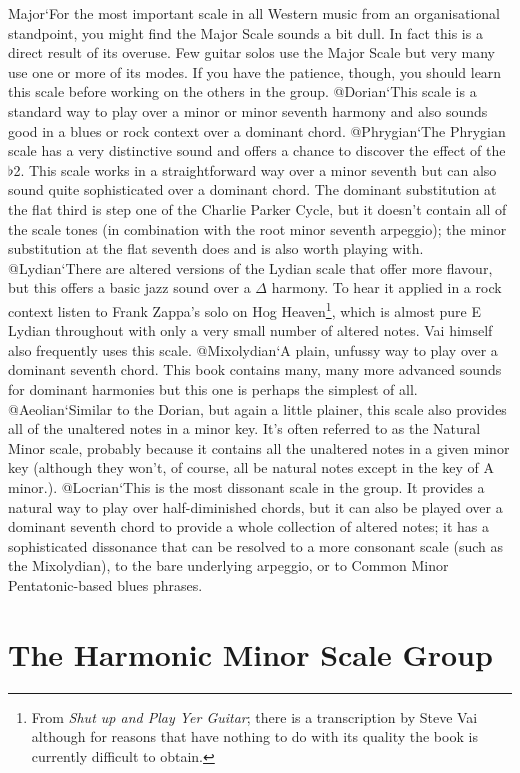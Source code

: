 \documentclass[english]{./gbook}
\begin{document}
\begin{large}
Major`For the most important scale in all Western music from an organisational standpoint, you might find the Major Scale sounds a bit dull. In fact this is a direct result of its overuse. Few guitar solos use the Major Scale but very many use one or more of its modes. If you have the patience, though, you should learn this scale before working on the others in the group.
@Dorian`This scale is a standard way to play over a minor or minor seventh harmony and also sounds good in a blues or rock context over a dominant chord.
@Phrygian`The Phrygian scale has a very distinctive sound and offers a chance to discover the effect of the $\flat$2. This scale works in a straightforward way over a minor seventh but can also sound quite sophisticated over a dominant chord. The dominant substitution at the flat third is step one of the Charlie Parker Cycle, but it doesn't contain all of the scale tones (in combination with the root minor seventh arpeggio); the minor substitution at the flat seventh does and is also worth playing with.
@Lydian`There are altered versions of the Lydian scale that offer more flavour, but this offers a basic jazz sound over a $\Delta$ harmony. To hear it applied in a rock context listen to Frank Zappa's solo on Hog Heaven\footnote{From \emph{Shut up and Play Yer Guitar}; there is a transcription by Steve Vai although for reasons that have nothing to do with its quality the book is currently difficult to obtain.}, which is almost pure E Lydian throughout with only a very small number of altered notes. Vai himself also frequently uses this scale.
@Mixolydian`A plain, unfussy way to play over a dominant seventh chord. This book contains many, many  more advanced sounds for dominant harmonies but this one is perhaps the simplest of all.
@Aeolian`Similar to the Dorian, but again a little plainer, this scale also provides all of the unaltered notes in a minor key. It's often referred to as the Natural Minor scale, probably because it contains all the unaltered notes in a given minor key (although they won't, of course, all be natural notes except in the key of A minor.).
@Locrian`This is the most dissonant scale in the group. It provides a natural way to play over half-diminished chords, but it can also be played over a dominant seventh chord to provide a whole collection of altered notes; it has  a sophisticated dissonance that can be resolved to a more consonant scale (such as the Mixolydian), to the bare underlying arpeggio, or to Common Minor Pentatonic-based blues phrases.
%

\section{The Harmonic Minor Scale Group}


\end{large}
\end{document}
